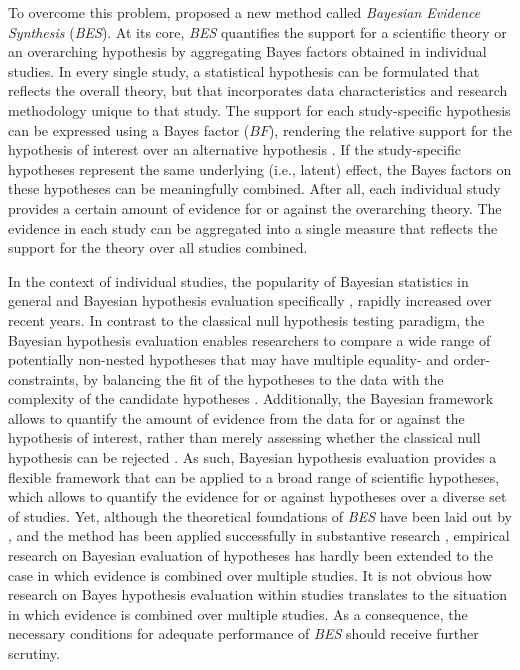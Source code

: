 \documentclass[review, 3p, authoryear]{elsarticle} %
\begin{document}
To overcome this problem, \citet{kuiper_combining_2013} proposed a new method called \emph{Bayesian Evidence Synthesis} (\emph{BES}).
At its core, \emph{BES} quantifies the support for a scientific theory or an overarching hypothesis by aggregating Bayes factors obtained in individual studies.
In every single study, a statistical hypothesis can be formulated that reflects the overall theory, but that incorporates data characteristics and research methodology unique to that study.
The support for each study-specific hypothesis can be expressed using a Bayes factor (\(BF\)), rendering the relative support for the hypothesis of interest over an alternative hypothesis \citep{kass_raftery_bayes_factors_1995}.
If the study-specific hypotheses represent the same underlying (i.e., latent) effect, the Bayes factors on these hypotheses can be meaningfully combined.
After all, each individual study provides a certain amount of evidence for or against the overarching theory.
The evidence in each study can be aggregated into a single measure that reflects the support for the theory over all studies combined.

In the context of individual studies, the popularity of Bayesian statistics in general \citep[e.g.,][]{lynch_bayesian_2019} and Bayesian hypothesis evaluation specifically \citep{vandeschoot_systematic_2017}, rapidly increased over recent years.
In contrast to the classical null hypothesis testing paradigm, the Bayesian hypothesis evaluation enables researchers to compare a wide range of potentially non-nested hypotheses that may have multiple equality- and order-constraints, by balancing the fit of the hypotheses to the data with the complexity of the candidate hypotheses \citep{klugkist_inequality_2005, hoijtink2019tutorial}.
Additionally, the Bayesian framework allows to quantify the amount of evidence from the data for or against the hypothesis of interest, rather than merely assessing whether the classical null hypothesis can be rejected \citep{Wagenmakers_bayesian_2018}.
As such, Bayesian hypothesis evaluation provides a flexible framework that can be applied to a broad range of scientific hypotheses, which allows to quantify the evidence for or against hypotheses over a diverse set of studies.
Yet, although the theoretical foundations of \emph{BES} have been laid out by \citet{kuiper_combining_2013}, and the method has been applied successfully in substantive research \citep[e.g.,][]{kevenaar_bes_2021, zondervan_parental_2019, zondervan_robust_2020, volker_cooperation_2022}, empirical research on Bayesian evaluation of hypotheses has hardly been extended to the case in which evidence is combined over multiple studies.
It is not obvious how research on Bayes hypothesis evaluation within studies translates to the situation in which evidence is combined over multiple studies.
As a consequence, the necessary conditions for adequate performance of \emph{BES} should receive further scrutiny.
\end{document}
